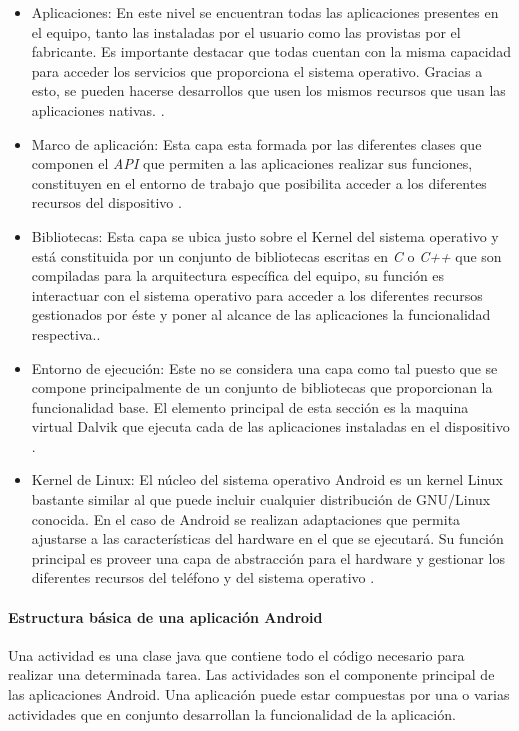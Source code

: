 \begin{itemize}
\item Aplicaciones: En este nivel se encuentran todas las aplicaciones presentes en el equipo, tanto las instaladas por el usuario como las provistas por el fabricante. Es importante destacar que todas cuentan con la misma capacidad para acceder los servicios que proporciona el sistema operativo. Gracias a esto, se pueden hacerse desarrollos que usen los mismos recursos que usan las aplicaciones nativas. \cite{AAT}.
\item Marco de aplicación: Esta capa esta formada por las diferentes clases que componen el \textit{API} que permiten a las aplicaciones realizar sus funciones, constituyen en el entorno de trabajo que posibilita acceder a los diferentes recursos del dispositivo \cite{AAT}.
\item Bibliotecas: Esta capa se ubica justo sobre el Kernel del sistema operativo y está constituida por un conjunto de bibliotecas escritas en \textit{C} o \textit{C++} que son compiladas para la arquitectura específica del equipo, su función es interactuar con el sistema operativo para acceder a los diferentes recursos gestionados por éste y poner al alcance de las aplicaciones la funcionalidad respectiva.\cite{AAT}. 
\item Entorno de ejecución: Este no se considera una capa como tal puesto que se compone principalmente de un conjunto de bibliotecas que proporcionan la funcionalidad base. El elemento principal de esta sección es la maquina virtual Dalvik que ejecuta cada de las aplicaciones instaladas en el dispositivo \cite{AAT}. 
\item Kernel de Linux: El núcleo del sistema operativo Android es un kernel Linux bastante similar al que puede incluir cualquier distribución de GNU/Linux conocida. En el caso de Android se realizan adaptaciones que permita ajustarse a las características del hardware en el que se ejecutará. Su función principal es proveer una capa de abstracción para el hardware y gestionar los diferentes recursos del teléfono y del sistema operativo \cite{AAT}.
\end{itemize}

\paragraph{Estructura básica de una aplicación Android}\mbox{}

Una actividad es una clase java que contiene todo el código necesario para realizar una determinada tarea. Las actividades son el componente principal de las aplicaciones Android. Una aplicación puede estar compuestas por una o varias actividades que en conjunto desarrollan la funcionalidad de la aplicación. 

